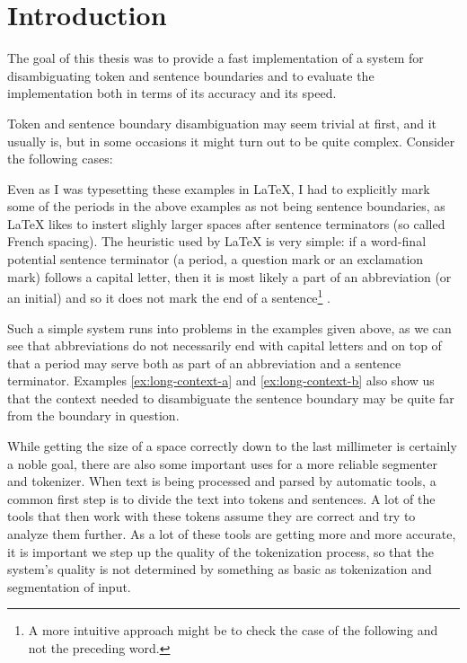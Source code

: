 \chapter*{Introduction}

The goal of this thesis was to provide a fast implementation of a system for
disambiguating token and sentence boundaries and to evaluate the
implementation both in terms of its accuracy and its speed.

Token and sentence boundary disambiguation may seem trivial at first, and it
usually is, but in some occasions it might turn out to be quite complex.
Consider the following cases:

\begin{exe}
\end{exe}

Even as I was typesetting these examples in \LaTeX{}, I had to explicitly mark
some of the periods in the above examples as not being sentence boundaries, as
\LaTeX{} likes to instert slighly larger spaces after sentence terminators (so
called French spacing). The heuristic used by \LaTeX{} is very simple: if a
word-final potential sentence terminator (a period, a question mark or an
exclamation mark) follows a capital letter, then it is most likely a part of
an abbreviation (or an initial) and so it does not mark the end of a
sentence\footnote{A more intuitive approach might be to check the case of the
following and not the preceding word.} \cite{web-latex}.

Such a simple system runs into problems in the examples given above, as we
can see that abbreviations do not necessarily end with capital letters and on
top of that a period may serve both as part of an abbreviation and a sentence
terminator. Examples \ref{ex:long-context-a} and \ref{ex:long-context-b} also
show us that the context needed to disambiguate the sentence boundary may be
quite far from the boundary in question.

While getting the size of a space correctly down to the last millimeter is
certainly a noble goal, there are also some important uses for a more reliable
segmenter and tokenizer. When text is being processed and parsed by automatic
tools, a common first step is to divide the text into tokens and sentences. A
lot of the tools that then work with these tokens assume they are correct and
try to analyze them further. As a lot of these tools are getting more and more
accurate, it is important we step up the quality of the tokenization process,
so that the system's quality is not determined by something as basic as
tokenization and segmentation of input. 

